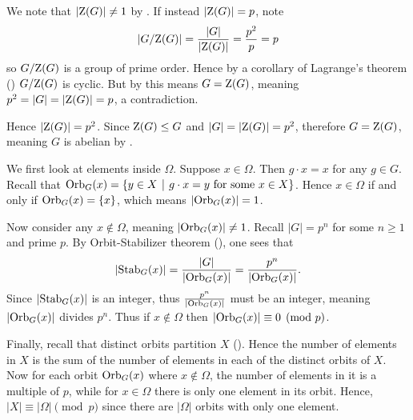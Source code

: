 \begin{questions}
    We note that $|\mathrm{Z}(G)| \neq 1$ by . If instead $|\mathrm{Z}(G)| = p$, note
    \[
        |G/\mathrm{Z}(G)| = \frac{|G|}{|\mathrm{Z}(G)|} = \frac{p^2}{p} = p
    \]
    so $G/\mathrm{Z}(G)$ is a group of prime order. Hence by a corollary of Lagrange's theorem () $G/\mathrm{Z}(G)$ is cyclic. But by  this means $G = \mathrm{Z}(G)$, meaning $p^2 = |G| = |\mathrm{Z}(G)| = p$, a contradiction.

    Hence $|\mathrm{Z}(G)| = p^2$. Since $\mathrm{Z}(G) \leq G$ and $|G| = |\mathrm{Z}(G)| = p^2$, therefore $G = \mathrm{Z}(G)$, meaning $G$ is abelian by .

    \item We first look at elements inside $\Omega$. Suppose $x \in \Omega$. Then $g \cdot x = x$ for any $g \in G$. Recall that $\Orb{G}{x} = \{y \in X \vert g \cdot x = y \text{ for some } x \in X\}$. Hence $x \in \Omega$ if and only if $\mathrm{Orb}_{G}(x) = \{x\}$, which means $|\mathrm{Orb}_{G}(x)| = 1$.

    Now consider any $x \notin \Omega$, meaning $|\mathrm{Orb}_{G}(x)| \neq 1$. Recall $|G| = p^n$ for some $n \geq 1$ and prime $p$. By Orbit-Stabilizer theorem (), one sees that
    \[
        |\mathrm{Stab}_{G}(x)| = \frac{|G|}{|\mathrm{Orb}_{G}(x)|} = \frac{p^n}{|\mathrm{Orb}_{G}(x)|}.
    \]
    Since $|\mathrm{Stab}_{G}(x)|$ is an integer, thus $\frac{p^n}{|\mathrm{Orb}_{G}(x)|}$ must be an integer, meaning $|\mathrm{Orb}_{G}(x)|$ divides $p^n$. Thus if $x \notin \Omega$ then $|\mathrm{Orb}_{G}(x)| \equiv 0 \pmod p$.

    Finally, recall that distinct orbits partition $X$ (). Hence the number of elements in $X$ is the sum of the number of elements in each of the distinct orbits of $X$. Now for each orbit $\mathrm{Orb}_{G}(x)$ where $x \notin \Omega$, the number of elements in it is a multiple of $p$, while for $x \in \Omega$ there is only one element in its orbit. Hence, $|X| \equiv |\Omega| \pmod p$ since there are $|\Omega|$ orbits with only one element.
\end{questions}
